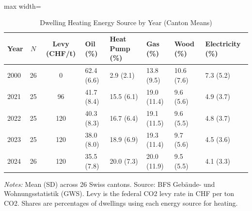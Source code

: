 \begin{table}[H]
\centering
\caption{Dwelling Heating Energy Source by Year (Canton Means)}
\label{tab:summary}
\begin{threeparttable}
\footnotesize
\begin{adjustbox}{max width=\textwidth}
\begin{tabular}{lcclllll}
\toprule
Year & $N$ & Levy (CHF/t) & Oil (\%) & Heat Pump (\%) & Gas (\%) & Wood (\%) & Electricity (\%) \\
\midrule
2000 & 26 & 0 & 62.4 (6.6) & 2.9 (2.1) & 13.8 (9.5) & 10.6 (7.6) & 7.3 (5.2) \\
2021 & 25 & 96 & 41.7 (8.4) & 15.5 (6.1) & 19.0 (11.4) & 9.6 (5.6) & 4.9 (3.7) \\
2022 & 25 & 120 & 40.3 (8.3) & 16.7 (6.4) & 19.1 (11.5) & 9.6 (5.5) & 4.8 (3.7) \\
2023 & 25 & 120 & 38.0 (8.0) & 18.9 (6.9) & 19.3 (11.4) & 9.7 (5.6) & 4.5 (3.6) \\
2024 & 26 & 120 & 35.5 (7.8) & 20.0 (7.3) & 20.0 (11.9) & 9.5 (5.5) & 4.1 (3.3) \\
\bottomrule
\end{tabular}
\end{adjustbox}
\begin{tablenotes}[flushleft]
\small
\item \textit{Notes:} Mean (SD) across 26 Swiss cantons. Source: BFS Geb\"aude- und Wohnungsstatistik (GWS). Levy is the federal CO2 levy rate in CHF per ton CO2. Shares are percentages of dwellings using each energy source for heating.
\end{tablenotes}
\end{threeparttable}
\end{table}
